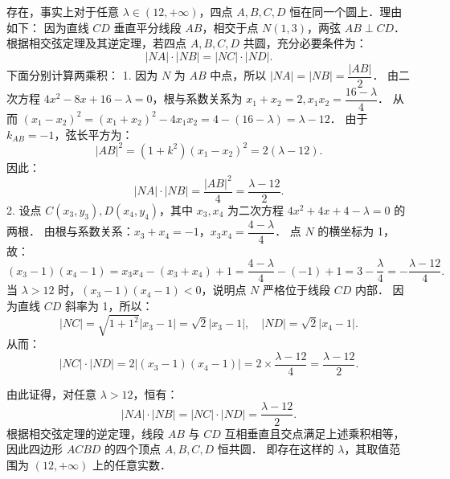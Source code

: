 \begin{answer}
存在，事实上对于任意 $\lambda \in (12, +\infty)$，四点 $A, B, C, D$ 恒在同一个圆上．理由如下：
因为直线 $CD$ 垂直平分线段 $AB$，相交于点 $N(1, 3)$，两弦 $AB \perp CD$．
根据相交弦定理及其逆定理，若四点 $A, B, C, D$ 共圆，充分必要条件为：
\nopagebreak[4]
\[
|NA| \cdot |NB| = |NC| \cdot |ND|.
\]
下面分别计算两乘积：
1. 因为 $N$ 为 $AB$ 中点，所以 $|NA| = |NB| = \dfrac{|AB|}{2}$．
   由二次方程 $4x^2 - 8x + 16 - \lambda = 0$，根与系数关系为 $x_1 + x_2 = 2, x_1 x_2 = \dfrac{16 - \lambda}{4}$．
   从而 $(x_1 - x_2)^2 = (x_1 + x_2)^2 - 4x_1 x_2 = 4 - (16 - \lambda) = \lambda - 12$．
   由于 $k_{AB} = -1$，弦长平方为：
\nopagebreak[4]
\[
|AB|^2 = (1 + k^2)(x_1 - x_2)^2 = 2(\lambda - 12).
\]
   因此：
\nopagebreak[4]
\[
|NA| \cdot |NB| = \frac{|AB|^2}{4} = \frac{\lambda - 12}{2}.
\]
2. 设点 $C(x_3, y_3), D(x_4, y_4)$，其中 $x_3, x_4$ 为二次方程 $4x^2 + 4x + 4 - \lambda = 0$ 的两根．
   由根与系数关系：$x_3 + x_4 = -1$，$x_3 x_4 = \dfrac{4 - \lambda}{4}$．
   点 $N$ 的横坐标为 1，故：
\nopagebreak[4]
\[
(x_3 - 1)(x_4 - 1) = x_3 x_4 - (x_3 + x_4) + 1 = \frac{4 - \lambda}{4} - (-1) + 1 = 3 - \frac{\lambda}{4} = -\frac{\lambda - 12}{4}.
\]
   当 $\lambda > 12$ 时，$(x_3 - 1)(x_4 - 1) < 0$，说明点 $N$ 严格位于线段 $CD$ 内部．
   因为直线 $CD$ 斜率为 1，所以：
\nopagebreak[4]
\[
|NC| = \sqrt{1 + 1^2} |x_3 - 1| = \sqrt{2}|x_3 - 1|, \quad |ND| = \sqrt{2}|x_4 - 1|.
\]
   从而：
\nopagebreak[4]
\[
|NC| \cdot |ND| = 2 |(x_3 - 1)(x_4 - 1)| = 2 \times \frac{\lambda - 12}{4} = \frac{\lambda - 12}{2}.
\]

由此证得，对任意 $\lambda > 12$，恒有：
\nopagebreak[4]
\[
|NA| \cdot |NB| = |NC| \cdot |ND| = \frac{\lambda - 12}{2}.
\]
根据相交弦定理的逆定理，线段 $AB$ 与 $CD$ 互相垂直且交点满足上述乘积相等，因此四边形 $ACBD$ 的四个顶点 $A, B, C, D$ 恒共圆．
即存在这样的 $\lambda$，其取值范围为 $(12, +\infty)$ 上的任意实数．



\end{answer}